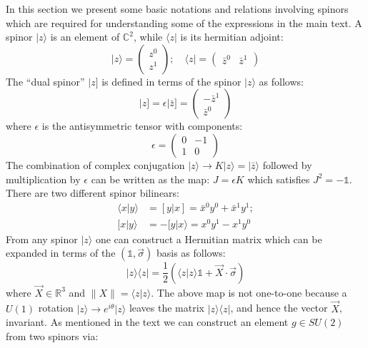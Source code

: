 \documentclass[twocolumn,final,aps,nofootinbib,nobibnotes]{revtex4-2}
\newcommand{\C}{\mathbb{C}}
\newcommand{\mbb}[1]{\mathbb{#1}}
\newcommand{\id}{\mathbb{1}}
\newcommand{\innerp}[2]{\langle #1 \vert #2 \rangle}
\newcommand{\bra}[1]{\langle #1 \vert}
\newcommand{\ket}[1]{\vert #1 \rangle}
\newcommand{\norm}[1]{\lVert #1 \rVert}
\newcommand{\rket}[1]{\vert #1 ]}
\newcommand{\rinnerp}[2]{[ #1 \vert #2 ]}
\newcommand{\innerpB}[2]{[ #1 \vert #2 \rangle}
\newcommand{\onehalf}{\frac{1}{2}}
\begin{document}
In this section we present some basic notations and relations involving spinors \cite{Livine2011Loop} which are required for understanding some of the expressions in the main text. A spinor $ \ket{z} $ is an element of $ \C^2 $, while $ \bra{z} $ is its hermitian adjoint:
\begin{equation}\label{eqn:spinors}
	\ket{z} = \begin{pmatrix}
		z^0 \\ z^1
	\end{pmatrix}; \quad \bra{z} = \begin{pmatrix}
									\bar z^0 & \bar z^1
									\end{pmatrix}
\end{equation}
The ``dual spinor'' $ \rket{z} $ is defined in terms of the spinor $ \ket{z} $ as follows:
\begin{equation}\label{eqn:dual-spinors}
	\rket{z} = \epsilon \rket{\bar z} = \begin{pmatrix}
											-\bar z^1 \\ \bar z^0
										\end{pmatrix}
\end{equation}
where $ \epsilon $ is the antisymmetric tensor with components:
\begin{equation}\label{eqn:epsilon-tensor}
	\epsilon = \begin{pmatrix}
					0 & -1 \\
					1 & 0
				\end{pmatrix}
\end{equation}
The combination of complex conjugation $ \ket{z} \rightarrow K \ket{z} = \ket{\bar z} $ followed by multiplication by $ \epsilon $ can be written as the map: $ J = \epsilon K $ which satisfies $ J^2 = -\id $. There are two different spinor bilinears:
\begin{align}\label{eqn:spinor-bilinears}
	\innerp{x}{y} & = \rinnerp{y}{x} = \bar x^0 y^0 + \bar x^1 y^1; \nonumber \\
	\innerpB{x}{y} & = -\innerpB{y}{x} = x^0 y^1 - x^1 y^0
\end{align}
From any spinor $ \ket{z} $ one can construct a Hermitian matrix which can be expanded in terms of the $ (\id, \vec{\sigma}) $ basis as follows:
\begin{equation}\label{eqn:spinor-matrix}
	\ket{z}\bra{z} = \onehalf (\innerp{z}{z} \id + \vec{X} \cdot \vec{\sigma})
\end{equation}
where $ \vec{X} \in \mbb{R}^3$ and $ \norm{X} = \innerp{z}{z}$. The above map is not one-to-one because a $ U(1) $ rotation $ \ket{z} \rightarrow e^{i\theta} \ket{z}$ leaves the matrix $ \ket{z}\bra{z} $, and hence the vector $ \vec{X} $, invariant. As mentioned in the text we can construct an element $ g \in SU(2) $ from two spinors via:
\end{document}

